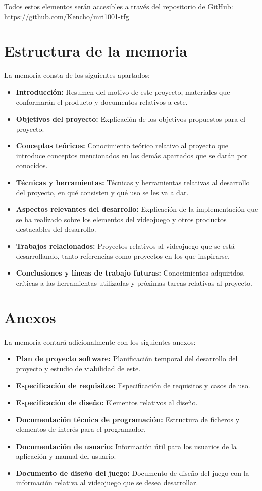 Todos estos elementos serán accesibles a través del repositorio de GitHub: \url{https://github.com/Kencho/mri1001-tfg}

\section{Estructura de la memoria}
La memoria consta de los siguientes apartados:
\begin{itemize}
\item
\textbf{Introducción:} Resumen del motivo de este proyecto, materiales que conformarán el producto y documentos relativos a este.
\item
\textbf{Objetivos del proyecto:} Explicación de los objetivos propuestos para el proyecto.
\item
\textbf{Conceptos teóricos:} Conocimiento teórico relativo al proyecto que introduce conceptos mencionados en los demás apartados que se darán por conocidos.
\item
\textbf{Técnicas y herramientas:} Técnicas y herramientas relativas al desarrollo del proyecto, en qué consisten y qué uso se les va a dar.
\item
\textbf{Aspectos relevantes del desarrollo:} Explicación de la implementación que se ha realizado sobre los elementos del videojuego y otros productos destacables del desarrollo.
\item
\textbf{Trabajos relacionados:} Proyectos relativos al videojuego que se está desarrollando, tanto referencias como proyectos en los que inspirarse.
\item
\textbf{Conclusiones y líneas de trabajo futuras:} Conocimientos adquiridos, críticas a las herramientas utilizadas y próximas tareas relativas al proyecto.
\end{itemize}

\section{Anexos}
La memoria contará adicionalmente con los siguientes anexos:
\begin{itemize}
\item
\textbf{Plan de proyecto software:} Planificación temporal del desarrollo del proyecto y estudio de viabilidad de este.
\item
\textbf{Especificación de requisitos:} Especificación de requisitos y casos de uso.
\item
\textbf{Especificación de diseño:} Elementos relativos al diseño.
\item
\textbf{Documentación técnica de programación:} Estructura de ficheros y elementos de interés para el programador.
\item
\textbf{Documentación de usuario:} Información útil para los usuarios de la aplicación y manual del usuario.
\item
\textbf{Documento de diseño del juego:} Documento de diseño del juego con la información relativa al videojuego que se desea desarrollar.
\end{itemize}